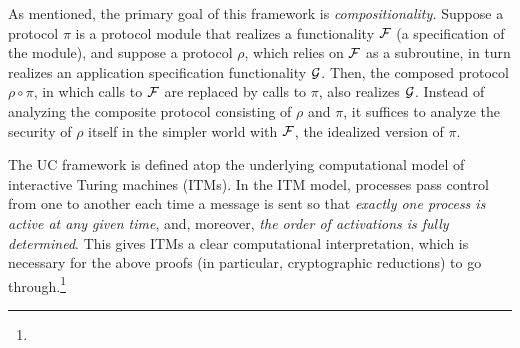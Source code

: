 As mentioned, the primary goal of this framework is
\emph{compositionality.}
Suppose a protocol $\pi$ is a protocol module that realizes a functionality $\mathcal{{F}}$ (a specification of the module),
and suppose a protocol $\rho$, which relies on $\mathcal{{F}}$ as a subroutine, in turn realizes an application specification functionality $\mathcal{{G}}$.
Then, the composed protocol $\rho \circ \pi$, in which calls to
$\mathcal{{F}}$ are replaced by calls to $\pi$, also realizes $\mathcal{{G}}$.
%
Instead of analyzing the composite protocol consisting of $\rho$ and $\pi$,
it suffices to analyze the security of $\rho$ itself in the simpler
world with $\mathcal{{F}}$, the idealized version of $\pi$.

The UC framework is defined atop the underlying computational model of
interactive Turing machines (ITMs). In the ITM model, processes pass control
from one to another each time a message is sent so that \emph{exactly one
  process is active at any given time}, and, moreover, \emph{the order of
  activations is fully determined}. This gives ITMs a clear computational
interpretation, which is necessary for the above proofs (in particular,
cryptographic reductions) to go through.\footnote{}


